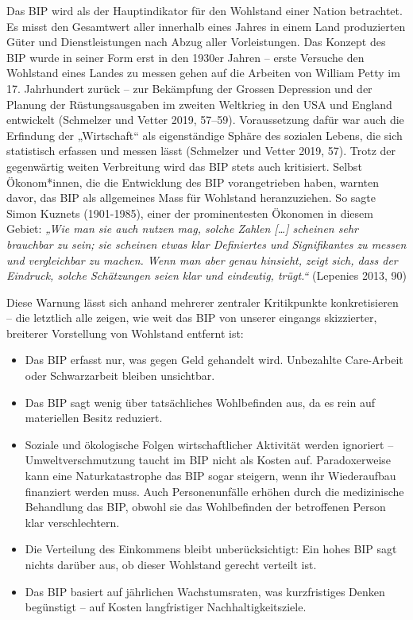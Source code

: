 \documentclass[
  nswissgerman,
  a4paper,
  DIV=11,
  numbers=noendperiod,
  oneside,
  openany]{scrreprt}
\begin{document}
Das BIP wird als der Hauptindikator für den Wohlstand einer Nation
betrachtet. Es misst den Gesamtwert aller innerhalb eines Jahres in
einem Land produzierten Güter und Dienstleistungen nach Abzug aller
Vorleistungen. Das Konzept des BIP wurde in seiner Form erst in den
1930er Jahren -- erste Versuche den Wohlstand eines Landes zu messen
gehen auf die Arbeiten von William Petty im 17. Jahrhundert zurück --
zur Bekämpfung der Grossen Depression und der Planung der
Rüstungsausgaben im zweiten Weltkrieg in den USA und England entwickelt
(Schmelzer und Vetter 2019, 57--59). Voraussetzung dafür war auch die
Erfindung der „Wirtschaft`` als eigenständige Sphäre des sozialen
Lebens, die sich statistisch erfassen und messen lässt (Schmelzer und
Vetter 2019, 57). Trotz der gegenwärtig weiten Verbreitung wird das BIP
stets auch kritisiert. Selbst Ökonom*innen, die die Entwicklung des BIP
vorangetrieben haben, warnten davor, das BIP als allgemeines Mass für
Wohlstand heranzuziehen. So sagte Simon Kuznets (1901-1985), einer der
prominentesten Ökonomen in diesem Gebiet: \emph{„Wie man sie auch nutzen
mag, solche Zahlen {[}\ldots{]} scheinen sehr brauchbar zu sein; sie
scheinen etwas klar Definiertes und Signifikantes zu messen und
vergleichbar zu machen. Wenn man aber genau hinsieht, zeigt sich, dass
der Eindruck, solche Schätzungen seien klar und eindeutig, trügt.``}
(Lepenies 2013, 90)

Diese Warnung lässt sich anhand mehrerer zentraler Kritikpunkte
konkretisieren -- die letztlich alle zeigen, wie weit das BIP von
unserer eingangs skizzierter, breiterer Vorstellung von Wohlstand
entfernt ist:

\begin{itemize}
\item
  Das BIP erfasst nur, was gegen Geld gehandelt wird. Unbezahlte
  Care-Arbeit oder Schwarzarbeit bleiben unsichtbar.
\item
  Das BIP sagt wenig über tatsächliches Wohlbefinden aus, da es rein auf
  materiellen Besitz reduziert.
\item
  Soziale und ökologische Folgen wirtschaftlicher Aktivität werden
  ignoriert -- Umweltverschmutzung taucht im BIP nicht als Kosten auf.
  Paradoxerweise kann eine Naturkatastrophe das BIP sogar steigern, wenn
  ihr Wiederaufbau finanziert werden muss. Auch Personenunfälle erhöhen
  durch die medizinische Behandlung das BIP, obwohl sie das Wohlbefinden
  der betroffenen Person klar verschlechtern.
\item
  Die Verteilung des Einkommens bleibt unberücksichtigt: Ein hohes BIP
  sagt nichts darüber aus, ob dieser Wohlstand gerecht verteilt ist.
\item
  Das BIP basiert auf jährlichen Wachstumsraten, was kurzfristiges
  Denken begünstigt -- auf Kosten langfristiger Nachhaltigkeitsziele.
\end{itemize}
\end{document}
